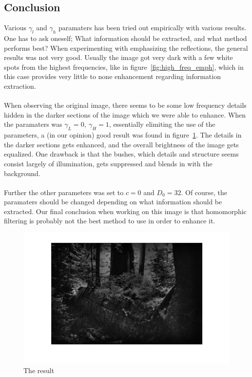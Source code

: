 		\subsection{Conclusion}
		Various $\gamma_l$ and $\gamma_h$ paramaters has been tried out empirically with 
		various results. One has to ask oneself; What information should be extracted, and what 
		method performs best? When experimenting with emphasizing the reflections, the 
		general results was not very good. Usually the image got very dark with a few white
		spots from the highest frequencies, like in figure~\ref{fig:high_freq_emph}, which
		in this case provides very little to none enhancement regarding information extraction.\\
		\\
		When observing the original image, there seems to be some 
		low frequency details hidden in the darker sections of the image which we were able
		to enhance. When the paramaters was $\gamma_L = 0,~\gamma_H = 1$,
		essentially elimiting the use of the parameters, a (in our opinion) good result was 
		found in figure~\ref{fig:result}. The details in the darker sections gets enhanced, 
		and the overall brightness
		of the image gets equalized. One drawback is that the bushes, which details 
		and structure seems consist
		largely of illumination, gets suppressed and blends in with the background.\\
		\\
		Further the other parameters was set to $c = 0$ and $D_0 = 32$. Of course,
		the paramaters should be changed depending on what information should be extracted.
		Our final conclusion when working on this image is that homomorphic filtering
		is probably not the best method to use in order to enhance it.
		\begin{figure}[h!]
			\includegraphics{pics/resulting_image.png}
			\caption{The result}
			\label{fig:result}		
		\end{figure}
							    
